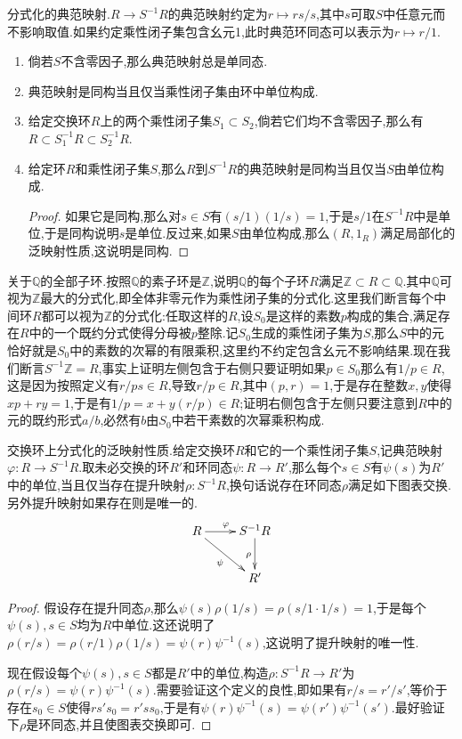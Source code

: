 分式化的典范映射.$R\to S^{-1}R$的典范映射约定为$r\mapsto rs/s$,其中$s$可取$S$中任意元而不影响取值.如果约定乘性闭子集包含幺元1,此时典范环同态可以表示为$r\mapsto r/1$.
\begin{enumerate}
	\item 倘若$S$不含零因子,那么典范映射总是单同态.
	\item 典范映射是同构当且仅当乘性闭子集由环中单位构成.
	\item 给定交换环$R$上的两个乘性闭子集$S_1\subset S_2$,倘若它们均不含零因子,那么有$R\subset S_1^{-1}R\subset S_2^{-1}R$.
	\item 给定环$R$和乘性闭子集$S$,那么$R$到$S^{-1}R$的典范映射是同构当且仅当$S$由单位构成.
	\begin{proof}
		
		如果它是同构,那么对$s\in S$有$(s/1)(1/s)=1$,于是$s/1$在$S^{-1}R$中是单位,于是同构说明$s$是单位.反过来,如果$S$由单位构成,那么$(R,1_R)$满足局部化的泛映射性质,这说明是同构.
	\end{proof}
\end{enumerate}

关于$\mathbb{Q}$的全部子环.按照$\mathbb{Q}$的素子环是$\mathbb{Z}$,说明$\mathbb{Q}$的每个子环$R$满足$\mathbb{Z}\subset R\subset\mathbb{Q}$.其中$\mathbb{Q}$可视为$\mathbb{Z}$最大的分式化,即全体非零元作为乘性闭子集的分式化.这里我们断言每个中间环$R$都可以视为$\mathbb{Z}$的分式化:任取这样的$R$,设$S_0$是这样的素数$p$构成的集合,满足存在$R$中的一个既约分式使得分母被$p$整除.记$S_0$生成的乘性闭子集为$S$,那么$S$中的元恰好就是$S_0$中的素数的次幂的有限乘积,这里约不约定包含幺元不影响结果.现在我们断言$S^{-1}\mathbb{Z}=R$,事实上证明左侧包含于右侧只要证明如果$p\in S_0$那么有$1/p\in R$,这是因为按照定义有$r/ps\in R$,导致$r/p\in R$,其中$(p,r)=1$,于是存在整数$x,y$使得$xp+ry=1$,于是有$1/p=x+y(r/p)\in R$;证明右侧包含于左侧只要注意到$R$中的元的既约形式$a/b$,必然有$b$由$S_0$中若干素数的次幂乘积构成.

交换环上分式化的泛映射性质.给定交换环$R$和它的一个乘性闭子集$S$,记典范映射$\varphi:R\to S^{-1}R$.取未必交换的环$R'$和环同态$\psi:R\to R'$,那么每个$s\in S$有$\psi(s)$为$R'$中的单位,当且仅当存在提升映射$\rho:S^{-1}R$,换句话说存在环同态$\rho$满足如下图表交换.另外提升映射如果存在则是唯一的.
$$\xymatrix{R\ar[r]^{\varphi}\ar[dr]_{\psi}&S^{-1}R\ar[d]_{\rho}\\ &R'}$$
\begin{proof}
	
	假设存在提升同态$\rho$,那么$\psi(s)\rho(1/s)=\rho(s/1\cdot1/s)=1$,于是每个$\psi(s),s\in S$均为$R$中单位.这还说明了$\rho(r/s)=\rho(r/1)\rho(1/s)=\psi(r)\psi^{-1}(s)$,这说明了提升映射的唯一性.
	
	现在假设每个$\psi(s),s\in S$都是$R'$中的单位,构造$\rho:S^{-1}R\to R'$为$\rho(r/s)=\psi(r)\psi^{-1}(s)$.需要验证这个定义的良性,即如果有$r/s=r'/s'$,等价于存在$s_0\in S$使得$rs's_0=r'ss_0$,于是有$\psi(r)\psi^{-1}(s)=\psi(r')\psi^{-1}(s')$.最好验证下$\rho$是环同态,并且使图表交换即可.
\end{proof}

